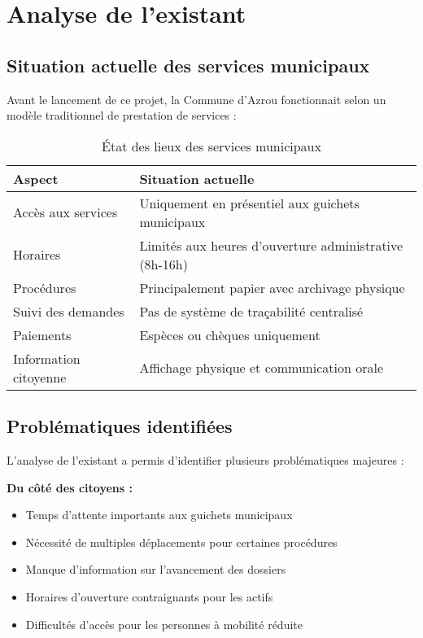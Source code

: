 \section{Analyse de l'existant}

\subsection{Situation actuelle des services municipaux}

Avant le lancement de ce projet, la Commune d'Azrou fonctionnait selon un modèle traditionnel de prestation de services :

\begin{table}[H]
\centering
\caption{État des lieux des services municipaux}
\begin{tabular}{|p{4cm}|p{10cm}|}
\hline
\textbf{Aspect} & \textbf{Situation actuelle} \\
\hline
Accès aux services & Uniquement en présentiel aux guichets municipaux \\
Horaires & Limités aux heures d'ouverture administrative (8h-16h) \\
Procédures & Principalement papier avec archivage physique \\
Suivi des demandes & Pas de système de traçabilité centralisé \\
Paiements & Espèces ou chèques uniquement \\
Information citoyenne & Affichage physique et communication orale \\
\hline
\end{tabular}
\end{table}

\subsection{Problématiques identifiées}

L'analyse de l'existant a permis d'identifier plusieurs problématiques majeures :

\textbf{Du côté des citoyens :}
\begin{itemize}
\item Temps d'attente importants aux guichets municipaux
\item Nécessité de multiples déplacements pour certaines procédures
\item Manque d'information sur l'avancement des dossiers
\item Horaires d'ouverture contraignants pour les actifs
\item Difficultés d'accès pour les personnes à mobilité réduite
\end{itemize}

